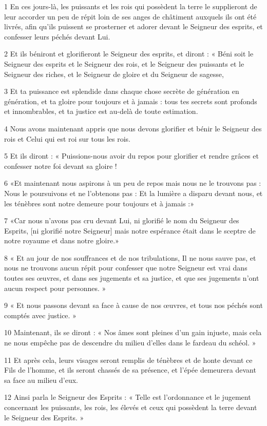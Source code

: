 \par 1 En ces jours-là, les puissants et les rois qui possèdent la terre le supplieront de leur accorder un peu de répit loin de ses anges de châtiment auxquels ils ont été livrés, afin qu'ils puissent se prosterner et adorer devant le Seigneur des esprits, et confesser leurs péchés devant Lui.
\par 2 Et ils béniront et glorifieront le Seigneur des esprits, et diront : « Béni soit le Seigneur des esprits et le Seigneur des rois, et le Seigneur des puissants et le Seigneur des riches, et le Seigneur de gloire et du Seigneur de sagesse,
\par 3 Et ta puissance est splendide dans chaque chose secrète de génération en génération, et ta gloire pour toujours et à jamais : tous tes secrets sont profonds et innombrables, et ta justice est au-delà de toute estimation.
\par 4 Nous avons maintenant appris que nous devons glorifier et bénir le Seigneur des rois et Celui qui est roi sur tous les rois.
\par 5 Et ils diront : « Puissions-nous avoir du repos pour glorifier et rendre grâces et confesser notre foi devant sa gloire !
\par 6 «Et maintenant nous aspirons à un peu de repos mais nous ne le trouvons pas : Nous le poursuivons et ne l'obtenons pas : Et la lumière a disparu devant nous, et les ténèbres sont notre demeure pour toujours et à jamais :»
\par 7 «Car nous n'avons pas cru devant Lui, ni glorifié le nom du Seigneur des Esprits, [ni glorifié notre Seigneur] mais notre espérance était dans le sceptre de notre royaume et dans notre gloire.»
\par 8 « Et au jour de nos souffrances et de nos tribulations, Il ne nous sauve pas, et nous ne trouvons aucun répit pour confesser que notre Seigneur est vrai dans toutes ses œuvres, et dans ses jugements et sa justice, et que ses jugements n'ont aucun respect pour personnes. »
\par 9 « Et nous passons devant sa face à cause de nos œuvres, et tous nos péchés sont comptés avec justice. »
\par 10 Maintenant, ils se diront : « Nos âmes sont pleines d'un gain injuste, mais cela ne nous empêche pas de descendre du milieu d'elles dans le fardeau du schéol. »
\par 11 Et après cela, leurs visages seront remplis de ténèbres et de honte devant ce Fils de l'homme, et ils seront chassés de sa présence, et l'épée demeurera devant sa face au milieu d'eux.
\par 12 Ainsi parla le Seigneur des Esprits : « Telle est l'ordonnance et le jugement concernant les puissants, les rois, les élevés et ceux qui possèdent la terre devant le Seigneur des Esprits. »

